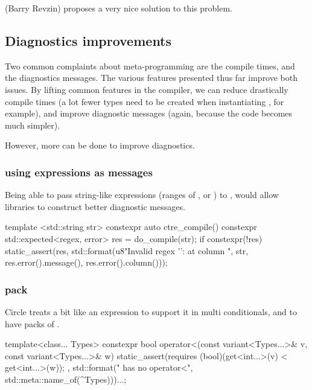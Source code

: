 \documentclass{wg21}
\begin{document}
 (Barry Revzin) proposes a very nice solution to this problem.

\subsection{Diagnostics improvements}

Two common complaints about meta-programming are the compile times,
and the diagnostics messages.
The various features presented thus far improve both issues. By lifting common features in the compiler,
we can reduce drastically compile times (a lot fewer types need to be created when instantiating , for example), and improve diagnostic messages (again, because the code becomes much simpler).

However, more can be done to improve diagnostics.

\subsubsection{ using expressions as messages}
\label{sec:static_assert_expr}

Being able to pass string-like expressions (ranges of , or ) to ,
would allow libraries to construct better diagnostic messages.

\begin{colorblock}
template <std::string str>
constexpr auto ctre_compile() {
   constexpr std::expected<regex, error> res = do_compile(str);
   if constexpr(!res) {
       static_assert(res, std::format(u8"Invalid regex '{}': {} at column {}",
                                      str, res.error().message(), res.error().column()));
   }
}
\end{colorblock}

\subsubsection{ pack}
\label{sec:static_assert_pack}

Circle treats  a bit like an expression to support it in multi conditionals, and to have packs of .

\begin{colorblock}
template<class... Types>
constexpr bool operator<(const variant<Types...>& v,  const variant<Types...>& w) {
    static_assert(requires{ (bool)(get<int...>(v) < get<int...>(w)); },
        std::format("{} has no operator<", std::meta::name_of(^Types)))...;
}
\end{colorblock}
\end{document}
